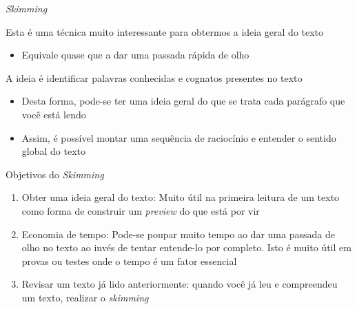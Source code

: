 \documentclass[compress,mathserif]{beamer}
\begin{document}
\begin{frame}{\textit{Skimming}}

Esta é uma técnica muito interessante para obtermos a ideia geral do texto
\begin{itemize}
    \item Equivale quase que a dar uma passada rápida de olho
\end{itemize}

\vspace{0.5cm}

A ideia é identificar palavras conhecidas e cognatos presentes no texto
\begin{itemize}
    \item Desta forma, pode-se ter uma ideia geral do que se trata cada parágrafo que você está lendo
    \item Assim, é possível montar uma sequência de raciocínio e entender o sentido global do texto
\end{itemize}

\end{frame}


\begin{frame}{Objetivos do \textit{Skimming}}

\begin{enumerate}
    \item Obter uma ideia geral do texto: Muito útil na primeira leitura de um texto como forma de construir um \textit{preview} do que está por vir \vspace{0.5cm}
    \item Economia de tempo: Pode-se poupar muito tempo ao dar uma passada de olho no texto ao invés de tentar entende-lo por completo. Isto é muito útil em provas ou testes onde o tempo é um fator essencial
    \vspace{0.5cm}
    \item Revisar um texto já lido anteriormente: quando você já leu e compreendeu um texto, realizar o \textit{skimming}
\end{enumerate}

\end{frame}

\end{document}
